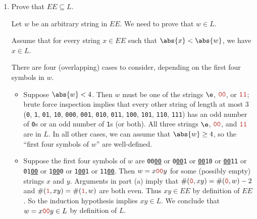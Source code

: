 \documentclass[11pt]{article}
\def\Sym#1{\texttt{\color{BrickRed}#1}}
\begin{document}
\begin{enumerate}
\begin{enumerate}
\begin{Solution}
\begin{itemize}
\item
Finally, suppose $w = x\Sym{11}y$ for some strings $x$ and $y$ such that $xy\in L$.  Then
\begin{align*}
	\#(\Sym0, w) 
	&=
	\#(\Sym0, x\Sym{11}y) \\
	&=
	\#(\Sym0, x) + \#(\Sym0, \Sym{11}) + \#(\Sym0, y) \\
	&=
	\#(\Sym0, x) + \#(\Sym0, y) \\
	&=
	\#(\Sym0, xy)
\end{align*}
The induction hypothesis implies $\#(\Sym0, w) = \#(\Sym0, xy)$ is even.
\end{itemize}
In all cases, we have shown that $\#(\Sym0, w)$ is even.  Symmetric arguments imply that $\#(\Sym1, w)$ is even.  We conclude that $w\in EE$.
\end{Solution}
\unskip
\begin{rubric}
5 points: standard induction rubric (scaled).  Yes, this is enough detail for $\#(\Sym1, w)$.  If explicit proofs are given for both $\#(\Sym0, w)$ and $\#(\Sym1, w)$, grade them independently, each for 2\textonehalf\ points.  
\end{rubric}

\medskip
\item Prove that $EE \subseteq L$.

\begin{Solution}\parindent 0pt
Let $w$ be an arbitrary string in $EE$.  We need to prove that $w\in L$.

Assume that for every string $x\in EE$ such that $\abs{x}<\abs{w}$, we have $x\in L$.

There are four (overlapping) cases to consider, depending on the first four symbols in $w$.
\begin{itemize}
\item
Suppose $\abs{w} < 4$.  Then $w$ must be one of the strings $\e$, $\Sym{00}$, or $\Sym{11}$; brute force inspection implies that every other string of length at most 3 (\Sym0, \Sym1, \Sym{01}, \Sym{10}, \Sym{000}, \Sym{001}, \Sym{010}, \Sym{011}, \Sym{100}, \Sym{101}, \Sym{110}, \Sym{111}) has an odd number of \Sym0s or an odd number of \Sym1s (or both).  All three strings $\e$, $\Sym{00}$, and $\Sym{11}$ are in $L$.  In all other cases, we can assume that $\abs{w} \ge 4$, so the “first four symbols of $w$” are well-defined.

\item
Suppose the first four symbols of $w$ are \Sym{00\underline{00}} or \Sym{0\underline{00}1} or \Sym{\underline{00}10} or \Sym{\underline{00}11} or \Sym{01\underline{00}} or \Sym{1\underline{00}0} or \Sym{1\underline{00}1} or \Sym{11\underline{00}}.  Then $w = x\Sym{00}y$ for some (possibly empty) strings $x$ and $y$.  Arguments in part (a) imply that $\#(\Sym0, xy) = \#(\Sym0, w) - 2$ and  $\#(\Sym1, xy) = \#(\Sym1, w)$ are both even.  Thus $xy\in EE$ by definition of $EE$.  So the induction hypothesis implies $xy\in L$.  We conclude that $w = x\Sym{00}y \in L$ by definition of $L$.


\end{itemize}
\end{Solution}
\end{enumerate}
\end{enumerate}
\end{document}

